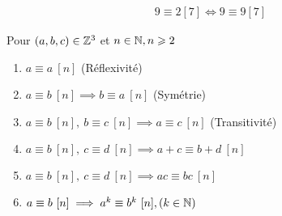 \begin{exemple}
\begin{align*}
9 \equiv 2 [7] \iff 9 \equiv 9 [7]
\end{align*}
\end{exemple}

\begin{graybox}
\begin{proposition}
Pour $(a, b, c) \in \mathbb{Z}^3$ et $n \in \mathbb{N}, n \geqslant 2$ 
\begin{enumerate}
\item $a \equiv a \ [n]$ (Réflexivité)
\item $a \equiv b \ [n] \implies b \equiv a \ [n]$ (Symétrie)
\item $a \equiv b \ [n],\ b \equiv c \ [n] \implies a \equiv c \ [n]$ (Transitivité)
\item $a \equiv b \ [n],\ c \equiv d \ [n] \implies a + c \equiv b + d \ [n]$
\item $a \equiv b \ [n],\ c \equiv d \ [n] \implies ac \equiv bc \ [n]$
\item $a \equiv b \ [n] \implies a^k \equiv b^k \ [n], (k \in \mathbb{N})$ 
\end{enumerate}
\end{proposition}
\end{graybox}


